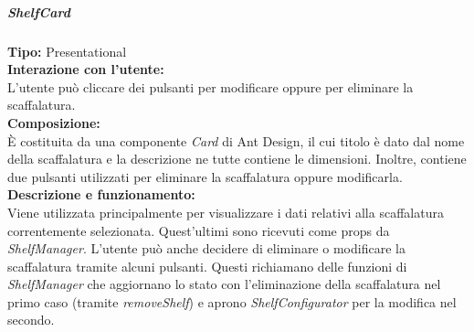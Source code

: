 \subparagraph{\colorbox{verde_uml}{ShelfCard}}
\textbf{Tipo:} Presentational \\
\textbf{Interazione con l'utente:} \\
L'utente può cliccare dei pulsanti per modificare oppure per eliminare la scaffalatura.\\
\textbf{Composizione:} \\
È costituita da una componente \textit{Card} di Ant Design, il cui titolo è dato dal nome della scaffalatura e la descrizione ne tutte contiene le dimensioni. Inoltre, contiene due pulsanti utilizzati per eliminare la scaffalatura oppure modificarla.\\
\textbf{Descrizione e funzionamento:} \\
Viene utilizzata principalmente per visualizzare i dati relativi alla scaffalatura correntemente selezionata. Quest'ultimi sono ricevuti come props da \textit{ShelfManager}. L'utente può anche decidere di eliminare o modificare la scaffalatura tramite alcuni pulsanti. Questi richiamano delle funzioni di \textit{ShelfManager} che aggiornano lo stato con l'eliminazione della scaffalatura nel primo caso (tramite \textit{removeShelf}) e aprono \textit{ShelfConfigurator} per la modifica nel secondo. 

